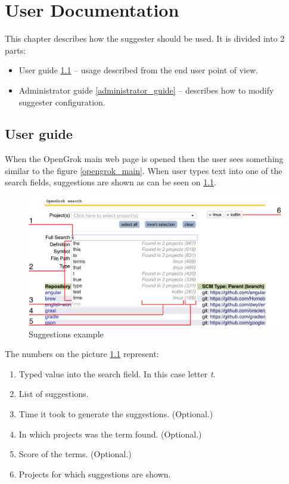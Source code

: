 \chapter{User Documentation}
\label{chap:user}

This chapter describes how the suggester should be used. It is divided into 2 parts:
\begin{itemize}
    \item User guide \ref{user_guide} – usage described from the end user point of view.
    \item Administrator guide \ref{administrator_guide} – describes how to modify suggester configuration.
\end{itemize}

\section{User guide}
\label{user_guide}
When the OpenGrok main web page is opened then the user sees something similar to the figure \ref{opengrok_main}.
When user types text into one of the search fields, suggestions are shown as can be seen on \ref{suggestions_pic}.

\begin{figure}[htbp]
    \centering
    \includegraphics[width=145mm]{../img/suggestions_pic.png}
    \caption{Suggestions example}
    \label{suggestions_pic}
\end{figure}

The numbers on the picture \ref{suggestions_pic} represent:
\begin{enumerate}
    \item Typed value into the search field. In this case letter \textit{t}.
    \item List of suggestions.
    \item Time it took to generate the suggestions. (Optional.)
    \item In which projects was the term found. (Optional.)
    \item Score of the terms. (Optional.)
    \item Projects for which suggestions are shown.
\end{enumerate}

